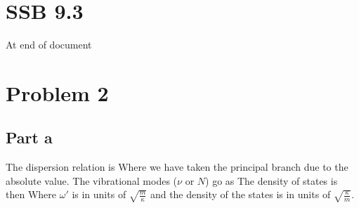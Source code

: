 \section*{SSB 9.3}
At end of document

\section*{Problem 2}
\subsection*{Part a}
The dispersion relation is
Where we have taken the principal branch due to the absolute value. The vibrational modes ($\nu$ or $N$) go as
The density of states is then
Where $\omega'$ is in units of $\sqrt{\frac{m}{\kappa}}$ and the density of the states is in units of $\sqrt{\frac{\kappa}{m}}$.
